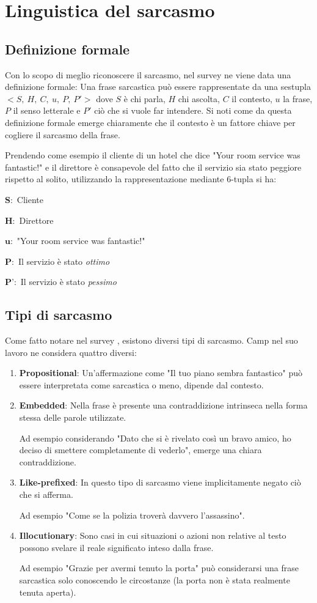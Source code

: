 \documentclass[oneside]{book}
\begin{document}
 
\section{Linguistica del sarcasmo}
\subsection{Definizione formale}
Con lo scopo di meglio riconoscere il sarcasmo, nel survey \cite{survey2} ne viene data una definizione formale:
Una frase sarcastica può essere rappresentate da una sestupla $<S,\ H,\ C,\ u,\ P,\ P'>$ dove $S$ è chi parla, $H$ chi ascolta, $C$ il contesto, $u$ la frase, $P$ il senso letterale e $P'$ ciò che si vuole far intendere. 
Si noti come da questa definizione formale emerge chiaramente che il contesto è un fattore chiave per cogliere il sarcasmo della frase.

Prendendo come esempio il cliente di un hotel che dice "Your room service was fantastic!" e il direttore è consapevole del fatto che il servizio sia stato peggiore rispetto al solito, utilizzando la rappresentazione mediante 6-tupla si ha:


$\textbf{S}:$ Cliente

$\textbf{H}:$ Direttore

$\textbf{u}:$ "Your room service was fantastic!"

$\textbf{P}:$ Il servizio è stato \textit{ottimo}

$\textbf{P'}:$ Il servizio è stato \textit{pessimo}

\subsection{Tipi di sarcasmo}
Come fatto notare nel survey \cite{survey5}, esistono diversi tipi di sarcasmo. Camp nel suo lavoro \cite{tipi-sarcasmo} ne considera quattro diversi:
\begin{enumerate}
	\item \textbf{Propositional}: Un'affermazione come "Il tuo piano sembra fantastico" può essere interpretata come sarcastica o meno, dipende dal contesto.
	\item \textbf{Embedded}: Nella frase è presente una contraddizione intrinseca nella forma stessa delle parole utilizzate.
	
	Ad esempio considerando "Dato che si è rivelato così un bravo amico, ho deciso di smettere completamente di vederlo", emerge una chiara contraddizione.
	\item \textbf{Like-prefixed}: In questo tipo di sarcasmo viene implicitamente negato ciò che si afferma.
	
	Ad esempio "Come se la polizia troverà davvero l'assassino".
	\item \textbf{Illocutionary}: Sono casi in cui situazioni o azioni non relative al testo possono svelare il reale significato inteso dalla frase. 
	
	Ad esempio "Grazie per avermi tenuto la porta" può considerarsi una frase sarcastica solo conoscendo le circostanze (la porta non è stata realmente tenuta aperta).
	
\end{enumerate}
\end{document}
